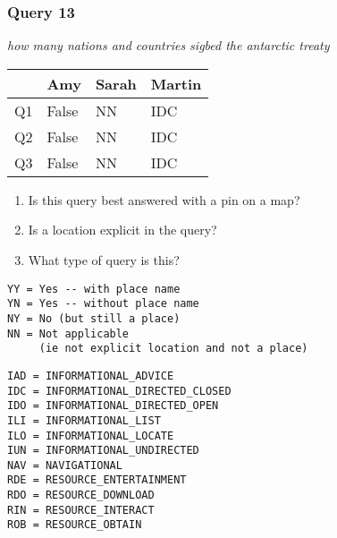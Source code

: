 \begin{frame}[fragile]
\frametitle{Query 13}
\vspace{1em}

\emph{how many nations and countries sigbed the antarctic treaty}

\vfill

\begin{table}
  \centering
  \begin{tabular}{ l l l l }
    & \textbf{Amy} & \textbf{Sarah} & \textbf{Martin}\\
    \toprule
    Q1 & False & NN & IDC\\
Q2 & False & NN & IDC\\
Q3 & False & NN & IDC\\
    \bottomrule
  \end{tabular}
\end{table}

\vfill

\tiny{

\begin{enumerate}
\item Is this query best answered with a pin on a map?
\item Is a location explicit in the query?
\item What type of query is this?
\end{enumerate}

\vfill

\begin{multicols}{2}
\begin{verbatim}
YY = Yes -- with place name
YN = Yes -- without place name
NY = No (but still a place)
NN = Not applicable 
     (ie not explicit location and not a place)
\end{verbatim}

\columnbreak
\begin{verbatim}
IAD = INFORMATIONAL_ADVICE
IDC = INFORMATIONAL_DIRECTED_CLOSED
IDO = INFORMATIONAL_DIRECTED_OPEN
ILI = INFORMATIONAL_LIST
ILO = INFORMATIONAL_LOCATE
IUN = INFORMATIONAL_UNDIRECTED
NAV = NAVIGATIONAL
RDE = RESOURCE_ENTERTAINMENT
RDO = RESOURCE_DOWNLOAD
RIN = RESOURCE_INTERACT
ROB = RESOURCE_OBTAIN
\end{verbatim}
\end{multicols}
}

\end{frame}


